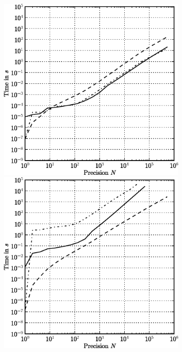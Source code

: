 \begin{figure}[ht]
\begin{minipage}[b]{0.5\linewidth}
\centering
\includegraphics[width=0.84\textwidth]{bin/qq-norm_d5}
\end{minipage}
\begin{minipage}[b]{0.5\linewidth}
\centering
\includegraphics[width=0.84\textwidth]{bin/qq-norm_d97}
\end{minipage}\\


\end{figure}
